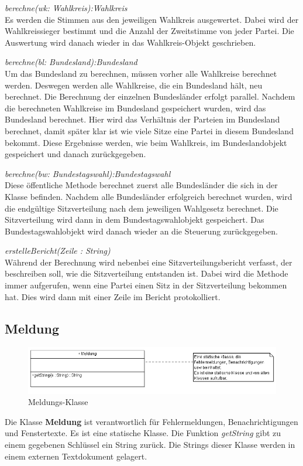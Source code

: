 \documentclass[12pt,a4paper,titlepage]{article}
\newcommand{\myma}{\fontfamily{pcr}\selectfont \textbf}
\newcommand{\mymo}{\fontfamily{pcr}\selectfont \textit}
\begin{document}
\begin{description}

\item {\mymo{berechne(wk: Wahlkreis):Wahlkreis}} \\
Es werden die Stimmen aus den jeweiligen Wahlkreis ausgewertet. Dabei wird der Wahlkreissieger bestimmt und die Anzahl der Zweitstimme von jeder Partei. Die Auswertung wird danach wieder in das Wahlkreis-Objekt geschrieben.
\item {\mymo{berechne(bl: Bundesland):Bundesland}} \\
Um das Bundesland zu berechnen, müssen vorher alle Wahlkreise berechnet werden. Deswegen werden alle Wahlkreise, die ein Bundesland hält, neu berechnet. Die Berechnung der einzelnen Bundesländer erfolgt parallel. Nachdem die berechneten Wahlkreise im Bundesland gespeichert wurden, wird das Bundesland berechnet. Hier wird das Verhältnis der Parteien im Bundesland berechnet, damit später klar ist wie viele Sitze eine Partei in diesem Bundesland bekommt. Diese Ergebnisse werden, wie beim Wahlkreis, im Bundeslandobjekt gespeichert und danach zurückgegeben. 
\item {\mymo{berechne(bw: Bundestagswahl):Bundestagswahl}} \\
Diese öffentliche Methode berechnet zuerst alle Bundesländer die sich in der Klasse befinden. Nachdem alle Bundesländer erfolgreich berechnet wurden, wird die endgültige Sitzverteilung nach dem jeweiligen Wahlgesetz berechnet. Die Sitzverteilung wird dann in dem Bundestagswahlobjekt gespeichert. Das Bundestagswahlobjekt wird danach wieder an die Steuerung zurückgegeben.
\item {\mymo{erstelleBericht(Zeile : String)}} \\
Während der Berechnung wird nebenbei eine Sitzverteilungsbericht verfasst, der beschreiben soll, wie die Sitzverteilung entstanden ist. Dabei wird die Methode immer aufgerufen, wenn eine Partei einen Sitz in der Sitzverteilung bekommen hat. Dies wird dann mit einer Zeile im Bericht protokolliert.
\end{description} 

\subsection{Meldung}
\begin{figure}[!ht]
\centering
\includegraphics[scale=0.8]{Meldung_Ausschnitt.png} \caption{Meldungs-Klasse} 
\end{figure}
Die Klasse {\myma{Meldung}} ist verantwortlich für Fehlermeldungen, Benachrichtigungen und Fenstertexte. Es ist eine statische Klasse. Die Funktion {\mymo{getString}} gibt zu einem gegebenen Schlüssel ein String zurück. Die Strings dieser Klasse werden in einem externen Textdokument gelagert.
\end{document}
